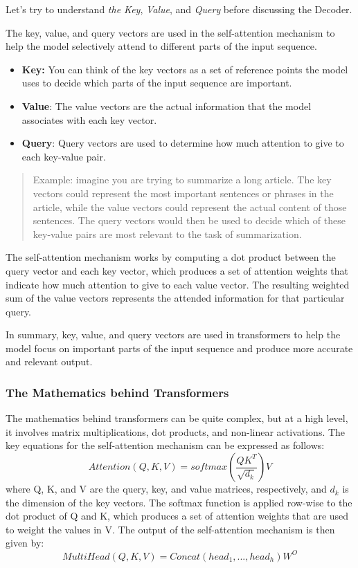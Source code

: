 Let's try to understand \textit{the Key}, \textit{Value}, and \textit{Query} before discussing the Decoder.

The key, value, and query vectors are used in the self-attention mechanism to help the model selectively attend to different parts of the input sequence.

\begin{itemize}
    \item \textbf{Key:} You can think of the key vectors as a set of reference points the model uses to decide which parts of the input sequence are important.
    \item \textbf{Value}: The value vectors are the actual information that the model associates with each key vector.
    \item \textbf{Query}: Query vectors are used to determine how much attention to give to each key-value pair.
\end{itemize}

\begin{quote}
Example: imagine you are trying to summarize a long article. The key vectors could represent the most important sentences or phrases in the article, while the value vectors could represent the actual content of those sentences. The query vectors would then be used to decide which of these key-value pairs are most relevant to the task of summarization.

\end{quote}

The self-attention mechanism works by computing a dot product between the query vector and each key vector, which produces a set of attention weights that indicate how much attention to give to each value vector. The resulting weighted sum of the value vectors represents the attended information for that particular query.

In summary, key, value, and query vectors are used in transformers to help the model focus on important parts of the input sequence and produce more accurate and relevant output.

\subsubsection{The Mathematics behind Transformers}

The mathematics behind transformers can be quite complex, but at a high level, it involves matrix multiplications, dot products, and non-linear activations. The key equations for the self-attention mechanism can be expressed as follows:
\[Attention(Q, K, V) = softmax(\frac{QK^T}{\sqrt{d_k}})V\]
where Q, K, and V are the query, key, and value matrices, respectively, and \(d_k\) is the dimension of the key vectors. The softmax function is applied row-wise to the dot product of Q and K, which produces a set of attention weights that are used to weight the values in V. The output of the self-attention mechanism is then given by: \[MultiHead(Q, K, V) = Concat(head_1, ..., head_h)W^O\]

